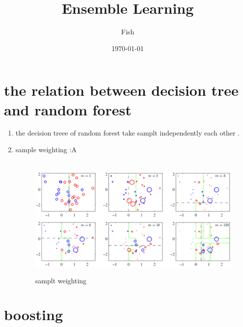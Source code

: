 \documentclass[12pt]{ctexart}%
\title{\kaishu Ensemble Learning}
\author{Fish}
\date{\today}
\begin{document}
	\maketitle
	\renewcommand{\contentsname}{Content} %
	\tableofcontents
	\clearpage
	\pagestyle{fancy}
	\setcounter{page}{1}
	
	\section{\quad the relation between decision tree and random forest}
		\begin{enumerate}
			\item the decision treee of random forest take samplt independently each other .
			\item sample weighting :A
				\begin{figure}[H]
					\vspace{-0.2cm}  %
					\setlength{\abovecaptionskip}{-0.2cm}   %
					\centering
					\includegraphics[scale=0.4]{sample_weighting.png}
					\renewcommand{\figurename}{Fig} %
					\caption{samplt weighting}
					\label{fig:1}
				\end{figure}
		\end{enumerate}
	
	\section{\quad boosting}
\end{document}
